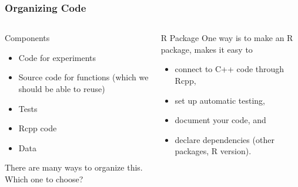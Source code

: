 \documentclass[aspectratio=1610,onlytextwidth]{beamer}
\begin{document}
\begin{frame}[c]
  \frametitle{Organizing Code}

  \begin{columns}[T]
    \begin{column}{0.45\textwidth}
      \begin{block}{Components}
        \begin{itemize}
          \item Code for experiments
          \item Source code for functions (which we should be able to reuse)
          \item Tests
          \item Rcpp code
          \item Data
        \end{itemize}
      \end{block}

      There are many ways to organize this. Which one to choose?
    \end{column}

    \pause

    \begin{column}{0.45\textwidth}
      \begin{block}{R Package}
        One way is to make an R package, makes it easy to
        \begin{itemize}
          \item connect to C++ code through Rcpp,
          \item set up automatic testing,
          \item document your code, and
          \item declare dependencies (other packages, R version).
        \end{itemize}
      \end{block}
    \end{column}
  \end{columns}
\end{frame}
\end{document}
